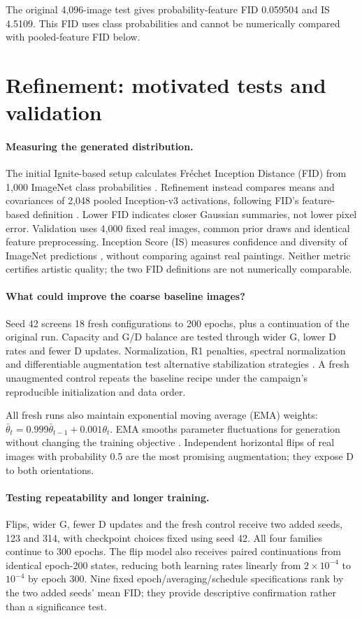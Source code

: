 \documentclass{article}
\begin{document}
The original 4,096-image test gives probability-feature FID 0.059504 and IS
4.5109. This FID uses class probabilities and cannot be numerically compared
with pooled-feature FID below.

\clearpage
\section{Refinement: motivated tests and validation}
\paragraph{Measuring the generated distribution.}
The initial Ignite-based setup calculates Fréchet Inception Distance (FID)
from 1,000 ImageNet class probabilities \citep{ignite}. Refinement instead compares means and covariances
of 2,048 pooled Inception-v3 activations, following FID's feature-based definition
\citep{ttur}. Lower FID indicates closer Gaussian summaries, not lower pixel
error. Validation uses 4,000 fixed real images, common prior draws and identical
feature preprocessing. Inception Score (IS) measures confidence and diversity of ImageNet
predictions \citep{salimans}, without comparing against real paintings. Neither metric certifies
artistic quality; the two FID definitions are not numerically comparable.

\paragraph{What could improve the coarse baseline images?}
Seed 42 screens 18 fresh configurations to 200 epochs, plus a continuation of
the original run. Capacity and G/D balance are tested through wider G, lower D
rates and fewer D updates. Normalization, R1 penalties, spectral normalization
and differentiable augmentation test alternative stabilization strategies
\citep{r1,sn,diffaug}. A fresh unaugmented control repeats the baseline recipe
under the campaign's reproducible initialization and data order.

All fresh runs also maintain exponential moving average (EMA) weights:
$\bar\theta_t=0.999\bar\theta_{t-1}+0.001\theta_t$. EMA smooths parameter
fluctuations for generation without changing the training objective
\citep{ema}. Independent horizontal flips of real images with probability 0.5
are the most promising augmentation; they expose D to both orientations.

\paragraph{Testing repeatability and longer training.}
Flips, wider G, fewer D updates and the fresh control receive two added seeds,
123 and 314, with checkpoint choices fixed using seed 42. All four families
continue to 300 epochs. The flip model also receives paired continuations from
identical epoch-200 states, reducing both learning rates linearly from
$2\times10^{-4}$ to $10^{-4}$ by epoch 300. Nine fixed epoch/averaging/schedule
specifications rank by the two added seeds' mean FID; they provide descriptive
confirmation rather than a significance test.
\end{document}
